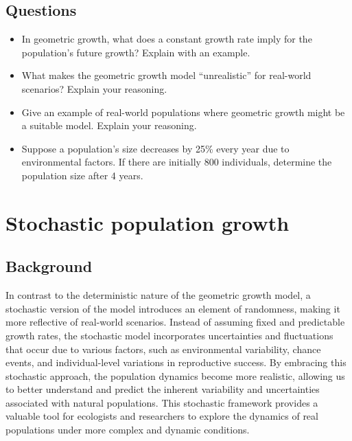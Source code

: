 \documentclass[
  a4paper]{book}
\providecommand{\tightlist}{%
  \setlength{\itemsep}{0pt}\setlength{\parskip}{0pt}}
\begin{document}
\hypertarget{questions-2}{%
\section{Questions}\label{questions-2}}

\begin{itemize}
\tightlist
\item
  In geometric growth, what does a constant growth rate imply for the population's future growth? Explain with an example.
\item
  What makes the geometric growth model ``unrealistic'' for real-world scenarios? Explain your reasoning.
\item
  Give an example of real-world populations where geometric growth might be a suitable model. Explain your reasoning.
\item
  Suppose a population's size decreases by 25\% every year due to environmental factors. If there are initially 800 individuals, determine the population size after 4 years.
\end{itemize}

\hypertarget{stochastic-population-growth}{%
\chapter{Stochastic population growth}\label{stochastic-population-growth}}

\hypertarget{background-2}{%
\section{Background}\label{background-2}}

In contrast to the deterministic nature of the geometric growth model, a stochastic version of the model introduces an element of randomness, making it more reflective of real-world scenarios. Instead of assuming fixed and predictable growth rates, the stochastic model incorporates uncertainties and fluctuations that occur due to various factors, such as environmental variability, chance events, and individual-level variations in reproductive success. By embracing this stochastic approach, the population dynamics become more realistic, allowing us to better understand and predict the inherent variability and uncertainties associated with natural populations. This stochastic framework provides a valuable tool for ecologists and researchers to explore the dynamics of real populations under more complex and dynamic conditions.
\end{document}
